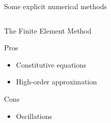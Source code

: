 \begin{withoutheadline}
\begin{frame}{Some explicit numerical methods}
\begin{overprint}
      \begin{columns}
        \begin{column}{0.49\textwidth}
          \vspace{-0.1cm}
          \begin{block}{The Finite Element Method \cite{Belytschko}}
            \begin{footnotesize}
              \begin{block}{\footnotesize Pros}
                \vspace{-0.2cm}
                \begin{itemize}
                \item[] Constitutive equations
                \item[] High-order approximation 
                \end{itemize}
              \end{block}
              \vspace{-0.2cm}
              \begin{block}{\footnotesize Cons}
                \vspace{-0.2cm}
                \begin{itemize}
                \item[] Oscillations
                \end{itemize}
              \end{block}
            \end{footnotesize}
          \end{block}
          

\end{column}
\end{columns}
\end{overprint}
\end{frame}
\end{withoutheadline}
